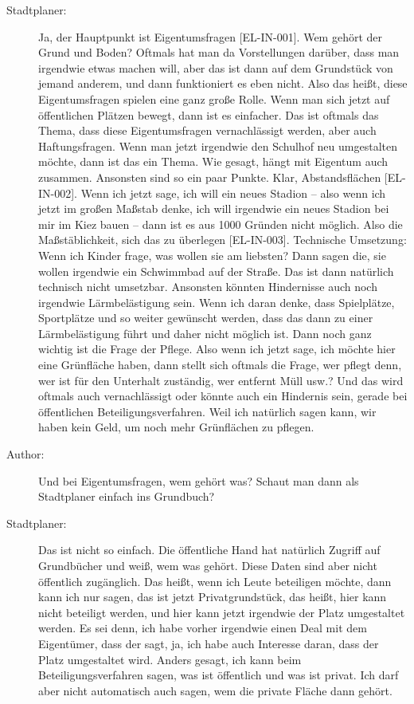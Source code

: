 \begin{description}
\item[Stadtplaner:] Ja, der Hauptpunkt ist Eigentumsfragen [EL-IN-001]. Wem gehört der Grund und Boden? Oftmals hat man da Vorstellungen darüber, dass man irgendwie etwas machen will, aber das ist dann auf dem Grundstück von jemand anderem, und dann funktioniert es eben nicht. Also das heißt, diese Eigentumsfragen spielen eine ganz große Rolle. Wenn man sich jetzt auf öffentlichen Plätzen bewegt, dann ist es einfacher. Das ist oftmals das Thema, dass diese Eigentumsfragen vernachlässigt werden, aber auch Haftungsfragen. Wenn man jetzt irgendwie den Schulhof neu umgestalten möchte, dann ist das ein Thema. Wie gesagt, hängt mit Eigentum auch zusammen. Ansonsten sind so ein paar Punkte. Klar, Abstandsflächen [EL-IN-002]. Wenn ich jetzt sage, ich will ein neues Stadion – also wenn ich jetzt im großen Maßstab denke, ich will irgendwie ein neues Stadion bei mir im Kiez bauen – dann ist es aus 1000 Gründen nicht möglich. Also die Maßstäblichkeit, sich das zu überlegen [EL-IN-003]. Technische Umsetzung: Wenn ich Kinder frage, was wollen sie am liebsten? Dann sagen die, sie wollen irgendwie ein Schwimmbad auf der Straße. Das ist dann natürlich technisch nicht umsetzbar. Ansonsten könnten Hindernisse auch noch irgendwie Lärmbelästigung sein. Wenn ich daran denke, dass Spielplätze, Sportplätze und so weiter gewünscht werden, dass das dann zu einer Lärmbelästigung führt und daher nicht möglich ist. Dann noch ganz wichtig ist die Frage der Pflege. Also wenn ich jetzt sage, ich möchte hier eine Grünfläche haben, dann stellt sich oftmals die Frage, wer pflegt denn, wer ist für den Unterhalt zuständig, wer entfernt Müll usw.? Und das wird oftmals auch vernachlässigt oder könnte auch ein Hindernis sein, gerade bei öffentlichen Beteiligungsverfahren. Weil ich natürlich sagen kann, wir haben kein Geld, um noch mehr Grünflächen zu pflegen.
\item[Author:] Und bei Eigentumsfragen, wem gehört was? Schaut man dann als Stadtplaner einfach ins Grundbuch?
\item[Stadtplaner:] Das ist nicht so einfach. Die öffentliche Hand hat natürlich Zugriff auf Grundbücher und weiß, wem was gehört. Diese Daten sind aber nicht öffentlich zugänglich. Das heißt, wenn ich Leute beteiligen möchte, dann kann ich nur sagen, das ist jetzt Privatgrundstück, das heißt, hier kann nicht beteiligt werden, und hier kann jetzt irgendwie der Platz umgestaltet werden. Es sei denn, ich habe vorher irgendwie einen Deal mit dem Eigentümer, dass der sagt, ja, ich habe auch Interesse daran, dass der Platz umgestaltet wird. Anders gesagt, ich kann beim Beteiligungsverfahren sagen, was ist öffentlich und was ist privat. Ich darf aber nicht automatisch auch sagen, wem die private Fläche dann gehört.

\end{description}
